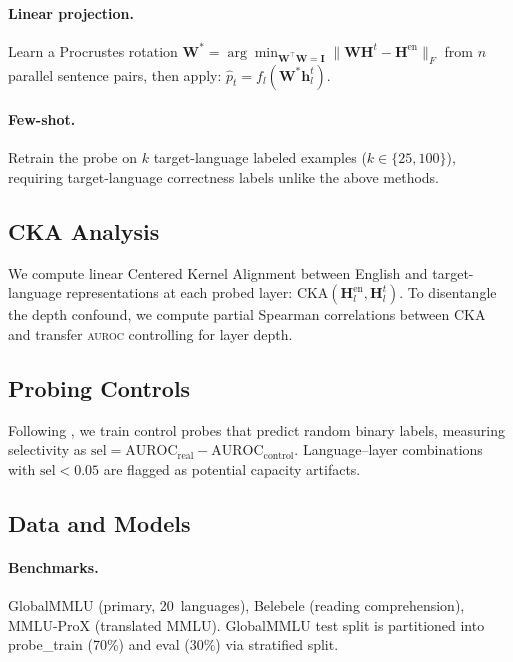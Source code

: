 \documentclass[11pt,a4paper]{article}
\newcommand{\aur}{\textsc{auroc}}
\newcommand{\cka}{\textsc{CKA}}
\begin{document}
\paragraph{Linear projection.} Learn a Procrustes rotation $\mathbf{W}^* = \arg\min_{\mathbf{W}^\top\mathbf{W}=\mathbf{I}} \|\mathbf{W}\mathbf{H}^t - \mathbf{H}^{\text{en}}\|_F$ from $n$ parallel sentence pairs, then apply: $\hat{p}_t = f_l(\mathbf{W}^* \mathbf{h}_l^t)$.

\paragraph{Few-shot.} Retrain the probe on $k$ target-language labeled examples ($k \in \{25, 100\}$), requiring target-language correctness labels unlike the above methods.

\subsection{CKA Analysis}

We compute linear Centered Kernel Alignment \cite{kornblith2019similarity} between English and target-language representations at each probed layer: $\text{CKA}(\mathbf{H}^{\text{en}}_l, \mathbf{H}^t_l)$. To disentangle the depth confound, we compute partial Spearman correlations between \cka{} and transfer \aur{} controlling for layer depth.

\subsection{Probing Controls}

Following \citet{hewitt2019designing}, we train control probes that predict random binary labels, measuring selectivity as $\text{sel} = \text{AUROC}_{\text{real}} - \text{AUROC}_{\text{control}}$. Language--layer combinations with $\text{sel} < 0.05$ are flagged as potential capacity artifacts.

\subsection{Data and Models}

\paragraph{Benchmarks.} GlobalMMLU (primary, 20~languages), Belebele (reading comprehension), MMLU-ProX (translated MMLU). GlobalMMLU test split is partitioned into probe\_train (70\%) and eval (30\%) via stratified split.
\end{document}
